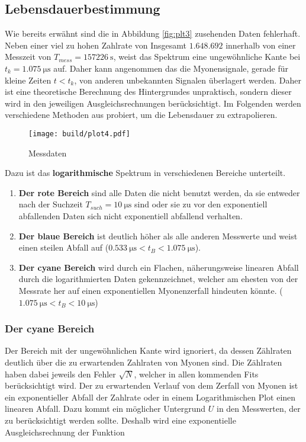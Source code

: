 \subsection{Lebensdauerbestimmung}
Wie bereits erwähnt sind die in Abbildung \eqref{fig:plt3} zusehenden Daten fehlerhaft. 
Neben einer viel zu hohen Zahlrate von Insgesamt $1.648.692$ innerhalb von einer Messzeit von $T_{mess}=\qty{157226}{\s}$,
weist das Spektrum eine ungewöhnliche Kante bei $t_k=\qty{1.075}{\us}$ auf.
Daher kann angenommen das die Myonensignale, gerade für kleine Zeiten $t<t_k$, von anderen unbekannten Signalen überlagert werden. 
Daher ist eine theoretische Berechnung des Hintergrundes unpraktisch, sondern dieser wird in den jeweiligen Ausgleichsrechnungen berücksichtigt. 
Im Folgenden werden verschiedene Methoden aus probiert, um die Lebensdauer zu extrapolieren. 
 
\begin{figure}[H]
	\centering
	\texttt{[image: build/plot4.pdf]}
	\caption{Messdaten}\label{fig:plt4}
\end{figure}

Dazu ist das \textbf{logarithmische} Spektrum in verschiedenen Bereiche unterteilt. 

\begin{enumerate}
	\item \textbf{Der rote Bereich} sind alle Daten die nicht benutzt werden, da sie entweder nach der Suchzeit $T_{such}=\qty{10}{\us}$ sind 
	oder sie zu vor den exponentiell abfallenden Daten sich nicht exponentiell abfallend verhalten. 
	\item \textbf{Der blaue Bereich} ist deutlich höher als alle anderen Messwerte und weist einen steilen Abfall auf ($\qty{0.533}{\us}<t_B<\qty{1.075}{\us}$).
	\item \textbf{Der cyane Bereich} wird durch ein Flachen, näherungsweise linearen Abfall durch die logarithmierten Daten gekennzeichnet, 
	welcher am ehesten von der Messrate her auf einen exponentiellen Myonenzerfall hindeuten könnte. ($\qty{1.075}{\us}<t_B<\qty{10}{\us}$)
\end{enumerate}

\subsubsection{Der cyane Bereich}
Der Bereich mit der ungewöhnlichen Kante wird ignoriert, da dessen Zählraten deutlich über die zu erwartenden Zahlraten von Myonen sind. 
Die Zählraten haben dabei jeweils den Fehler $\sqrt{N}$, welcher in allen kommenden Fits berücksichtigt wird. 
Der zu erwartenden Verlauf von dem Zerfall von Myonen ist ein exponentieller Abfall der Zahlrate oder in einem Logarithmischen Plot einen linearen Abfall. 
Dazu kommt ein möglicher Untergrund $U$ in den Messwerten, der zu berücksichtigt werden sollte. 
Deshalb wird eine exponentielle Ausgleichsrechnung der Funktion 

